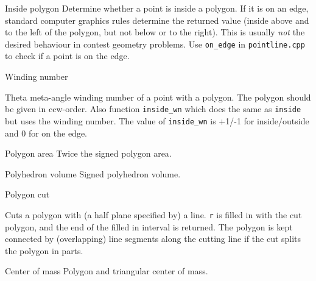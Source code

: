 \begin{algorithm}{Inside polygon}
\desc
Determine whether a point is inside a polygon. If it is on an edge,
standard computer graphics rules determine the returned value (inside above
and to the left of the polygon, but not below or to the right).
This is usually \emph{not} the desired behaviour in contest geometry problems.
Use {\tt on\_edge} in {\tt pointline.cpp} to check if a point is on the edge.
\end{algorithm}


\begin{algorithm}{Winding number}

\desc
Theta meta-angle winding number of a point with a polygon. The polygon should
be given in ccw-order. Also function {\tt inside\_wn} which does the same as
{\tt inside} but uses the winding number. The value of {\tt inside\_wn} is
+1/-1 for inside/outside and 0 for on the edge.
\end{algorithm}

\begin{algorithm}{Polygon area}
\desc
Twice the signed polygon area.
\end{algorithm}

\begin{algorithm}{Polyhedron volume}
\desc
Signed polyhedron volume.
\end{algorithm}

\begin{algorithm}{Polygon cut}

\desc
Cuts a polygon with (a half plane specified by) a line.
{\tt r} is filled in with the cut polygon, and the end of the filled in
interval is returned. The polygon is kept connected by (overlapping)
line segments along the cutting line if the cut splits the polygon in parts.
\end{algorithm}



\begin{algorithm}{Center of mass}
\desc
Polygon and triangular center of mass.
\end{algorithm}

